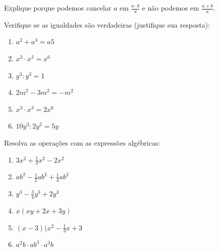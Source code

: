 \begin{description}

\item[\thesubsection.\theexercicio] Explique porque podemos cancelar $a$ em $\frac{a \cdot{} b}{a}$ e não podemos em $\frac{a+b}{a}$.

\item[\thesubsection.\theexercicio] Verifique se as igualdades são verdadeiras (justifique sua resposta):
\begin{multicols}{2}

\begin{enumerate}[label=\alph*)]

\item $a^2  + a^3  = a5$

\item $x^3  \cdot  x^3 = x^6$

\item $y^3 : y^3 = 1$

\item $2m^2 - 3m^2 = -m^2$

\item $x^3 \cdot x^3 = 2x^6$

\item $10y^3 : 2y^2 = 5y$

\end{enumerate}

\end{multicols}

\item[\thesubsection.\theexercicio] Resolva as operações com as expressões algébricas:

\begin{multicols}{2}

\begin{enumerate}[label=\alph*)]
    \item $3x^2 + \frac{1}{3}x^2 - 2x^2$
    
    \item $ab^2 - \frac{1}{2}ab^2 + \frac{1}{4}ab^2$
    
    \item $y^3 - \frac{3}{4}y^3 + 2y^3$
    
    \item $x(xy+2x+3y)$
    
    \item $(x-3)(x^2-\frac{1}{3}x+3$
    
    \item $a^2b \cdot ab^3 \cdot a^3b$
    

\end{enumerate}
\end{multicols}
\end{description}
